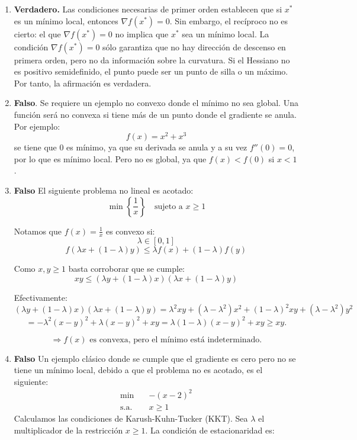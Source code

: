 \begin{enumerate}
  \item \textbf{Verdadero.} Las condiciones necesarias de primer orden establecen que si $x^*$ es un mínimo local, entonces $\nabla f(x^*) = 0$. Sin embargo, el recíproco no es cierto: el que $\nabla f(x^*) = 0$ no implica que $x^*$ sea un mínimo local. La condición $\nabla f(x^*) = 0$ sólo garantiza que no hay dirección de descenso en primera orden, pero no da información sobre la curvatura. Si el Hessiano no es positivo semidefinido, el punto puede ser un punto de silla o un máximo. Por tanto, la afirmación es verdadera.
  \item \textbf{Falso}. Se requiere un ejemplo no convexo donde el mínimo no sea global. Una función será no convexa si tiene más de un punto donde el gradiente se anula. Por ejemplo:
    \[
    f(x)=x^2+x^3
    \]
    se tiene que 0 es mínimo, ya que su derivada se anula y a su vez $f''(0)=0$, por lo que es mínimo local. Pero no es global, ya que $f(x)<f(0)$ si $x<1$.
  \item \textbf{Falso}
    El siguiente problema no lineal es acotado:
\[
\min \left\{ \frac{1}{x} \right\} \quad \text{sujeto a } x \geq 1
\]

Notamos que \( f(x) = \frac{1}{x} \) es convexo si:
\[
\lambda \in [0, 1]
\]
\[
f(\lambda x + (1 - \lambda)y) \leq \lambda f(x) + (1 - \lambda)f(y)
\]

Como \( x, y \geq 1 \) basta corroborar que se cumple:
\[
xy \leq (\lambda y + (1 - \lambda)x)(\lambda x + (1 - \lambda)y)
\]

Efectivamente:
\[
(\lambda y + (1 - \lambda)x)(\lambda x + (1 - \lambda)y) = \lambda^2 xy + (\lambda - \lambda^2)x^2 + (1 - \lambda)^2xy + (\lambda - \lambda^2)y^2
\]
\[
= -\lambda^2(x - y)^2 + \lambda(x - y)^2 + xy = \lambda(1 - \lambda)(x - y)^2 + xy \geq xy.
\]

\[
\Rightarrow f(x) \text{ es convexa, pero el mínimo está indeterminado.}
\]
  \item \textbf{Falso} Un ejemplo clásico donde se cumple que el gradiente es cero pero no se tiene un mínimo local, debido a que el problema no es acotado, es el siguiente:
\begin{align*}
\min \quad & -(x - 2)^2 \\
\text{s.a.} \quad & x \geq 1
\end{align*}
Calculamos las condiciones de Karush-Kuhn-Tucker (KKT). Sea $\lambda$ el multiplicador de la restricción \( x \geq 1 \). La condición de estacionaridad es:


\end{enumerate}
